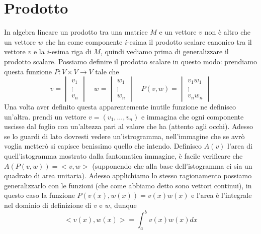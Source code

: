 \documentclass[11pt,a4paper]{article}
\begin{document}
		\section{Prodotto}
			In algebra lineare un prodotto tra una matrice $M$ e un vettore $v$ non è altro che un vettore $w$ che ha come componente $i$-esima il prodotto scalare canonico tra il vettore $v$ e la $i$-esima riga di $M$, quindi vediamo prima di generalizzare il prodotto scalare.\newline
			Possiamo definire il prodotto scalare in questo modo: prendiamo questa funzione $P:V\times V\rightarrow V$ tale che 
			\begin{equation}
				v=
				\begin{vmatrix}
					v_1\\
					\vdots \\
					v_n
				\end{vmatrix}
				\quad w=
				\begin{vmatrix}
					w_1\\
					\vdots \\
					w_n
				\end{vmatrix}
				\quad P(v,w)=
				\begin{vmatrix}
					v_1 w_1\\
					\vdots \\
					v_n w_n
				\end{vmatrix}
			\end{equation}
			Una volta aver definito questa apparentemente inutile funzione ne definisco un'altra.
			prendi un vettore $v=(v_1,\dots,v_n)$ e immagina che ogni componente uscisse dal foglio con un'altezza pari al valore che ha (attento agli occhi).\newline
			Adesso se lo guardi di lato dovresti vedere un'istrogramma, nell'immagine che se avrò voglia metterò si capisce benissimo quello che intendo.\newline
			Definisco $A(v)$ l'area di quell'istogramma mostrato dalla fantomatica immagine, è facile verificare che $A(P(v,w))=<v,w>$ (supponendo che alla base dell'istogramma ci sia un quadrato di area unitaria).\newline
			Adesso applichiamo lo stesso ragionamento possiamo generalizzarlo con le funzioni (che come abbiamo detto sono vettori continui), in questo caso la funzione $P(v(x),w(x))=v(x)w(x)$ e l'area è l'integrale nel dominio di definizione di $v$ e $w$, dunque
			\begin{equation}
			<v(x),w(x)>=\int_a^b v(x)w(x)dx
			\end{equation}
\end{document}
